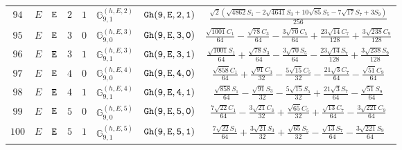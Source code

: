 \documentclass[fleqn,8pt]{jsarticle}
\begin{document}
\begin{table}[ht!]
\begin{center}
\begin{tabular}{cccccccc}
$ 94 $ & $ E $ & $ {\tt E} $ & $ 2 $ & $ 1 $ & $ \mathbb{G}_{9,1}^{(h,E,2)} $ & $ {\tt Gh(9,E,2,1)} $ & $ \frac{\sqrt{2} \left(\sqrt{4862} S_{1} - 2 \sqrt{4641} S_{3} + 10 \sqrt{85} S_{5} - 7 \sqrt{17} S_{7} + 3 S_{9}\right)}{256} $ \\
$ 95 $ & $ E $ & $ {\tt E} $ & $ 3 $ & $ 0 $ & $ \mathbb{G}_{9,0}^{(h,E,3)} $ & $ {\tt Gh(9,E,3,0)} $ & $ \frac{\sqrt{1001} C_{1}}{64} - \frac{\sqrt{78} C_{3}}{64} - \frac{3 \sqrt{70} C_{5}}{64} + \frac{23 \sqrt{14} C_{7}}{128} + \frac{3 \sqrt{238} C_{9}}{128} $ \\
$ 96 $ & $ E $ & $ {\tt E} $ & $ 3 $ & $ 1 $ & $ \mathbb{G}_{9,1}^{(h,E,3)} $ & $ {\tt Gh(9,E,3,1)} $ & $ \frac{\sqrt{1001} S_{1}}{64} + \frac{\sqrt{78} S_{3}}{64} - \frac{3 \sqrt{70} S_{5}}{64} - \frac{23 \sqrt{14} S_{7}}{128} + \frac{3 \sqrt{238} S_{9}}{128} $ \\
$ 97 $ & $ E $ & $ {\tt E} $ & $ 4 $ & $ 0 $ & $ \mathbb{G}_{9,0}^{(h,E,4)} $ & $ {\tt Gh(9,E,4,0)} $ & $ \frac{\sqrt{858} C_{1}}{64} + \frac{\sqrt{91} C_{3}}{32} - \frac{5 \sqrt{15} C_{5}}{32} - \frac{21 \sqrt{3} C_{7}}{64} - \frac{\sqrt{51} C_{9}}{64} $ \\
$ 98 $ & $ E $ & $ {\tt E} $ & $ 4 $ & $ 1 $ & $ \mathbb{G}_{9,1}^{(h,E,4)} $ & $ {\tt Gh(9,E,4,1)} $ & $ \frac{\sqrt{858} S_{1}}{64} - \frac{\sqrt{91} S_{3}}{32} - \frac{5 \sqrt{15} S_{5}}{32} + \frac{21 \sqrt{3} S_{7}}{64} - \frac{\sqrt{51} S_{9}}{64} $ \\
$ 99 $ & $ E $ & $ {\tt E} $ & $ 5 $ & $ 0 $ & $ \mathbb{G}_{9,0}^{(h,E,5)} $ & $ {\tt Gh(9,E,5,0)} $ & $ \frac{7 \sqrt{22} C_{1}}{64} - \frac{3 \sqrt{21} C_{3}}{32} + \frac{\sqrt{65} C_{5}}{32} + \frac{\sqrt{13} C_{7}}{64} - \frac{3 \sqrt{221} C_{9}}{64} $ \\
$ 100 $ & $ E $ & $ {\tt E} $ & $ 5 $ & $ 1 $ & $ \mathbb{G}_{9,1}^{(h,E,5)} $ & $ {\tt Gh(9,E,5,1)} $ & $ \frac{7 \sqrt{22} S_{1}}{64} + \frac{3 \sqrt{21} S_{3}}{32} + \frac{\sqrt{65} S_{5}}{32} - \frac{\sqrt{13} S_{7}}{64} - \frac{3 \sqrt{221} S_{9}}{64} $ \\
 \hline \hline
\end{tabular}
\end{center}
\end{table}
\end{document}
